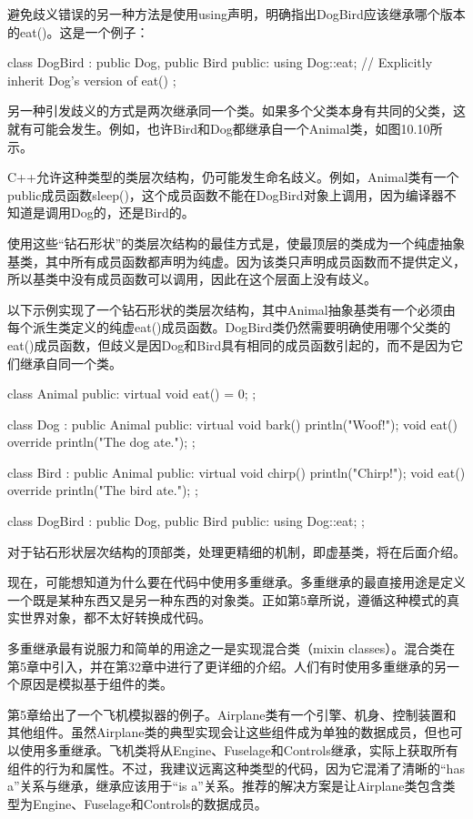 避免歧义错误的另一种方法是使用using声明，明确指出DogBird应该继承哪个版本的eat()。这是一个例子：

\begin{cpp}
class DogBird : public Dog, public Bird
{
    public:
        using Dog::eat; // Explicitly inherit Dog's version of eat()
};
\end{cpp}


另一种引发歧义的方式是两次继承同一个类。如果多个父类本身有共同的父类，这就有可能会发生。例如，也许Bird和Dog都继承自一个Animal类，如图10.10所示。


C++允许这种类型的类层次结构，仍可能发生命名歧义。例如，Animal类有一个public成员函数sleep()，这个成员函数不能在DogBird对象上调用，因为编译器不知道是调用Dog的，还是Bird的。

使用这些“钻石形状”的类层次结构的最佳方式是，使最顶层的类成为一个纯虚抽象基类，其中所有成员函数都声明为纯虚。因为该类只声明成员函数而不提供定义，所以基类中没有成员函数可以调用，因此在这个层面上没有歧义。

以下示例实现了一个钻石形状的类层次结构，其中Animal抽象基类有一个必须由每个派生类定义的纯虚eat()成员函数。DogBird类仍然需要明确使用哪个父类的eat()成员函数，但歧义是因Dog和Bird具有相同的成员函数引起的，而不是因为它们继承自同一个类。

\begin{cpp}
class Animal
{
    public:
        virtual void eat() = 0;
};

class Dog : public Animal
{
    public:
        virtual void bark() { println("Woof!"); }
        void eat() override { println("The dog ate."); }
};

class Bird : public Animal
{
    public:
        virtual void chirp() { println("Chirp!"); }
        void eat() override { println("The bird ate."); }
};

class DogBird : public Dog, public Bird
{
    public:
        using Dog::eat;
};
\end{cpp}

对于钻石形状层次结构的顶部类，处理更精细的机制，即虚基类，将在后面介绍。


现在，可能想知道为什么要在代码中使用多重继承。多重继承的最直接用途是定义一个既是某种东西又是另一种东西的对象类。正如第5章所说，遵循这种模式的真实世界对象，都不太好转换成代码。

多重继承最有说服力和简单的用途之一是实现混合类（mixin classes）。混合类在第5章中引入，并在第32章中进行了更详细的介绍。人们有时使用多重继承的另一个原因是模拟基于组件的类。

第5章给出了一个飞机模拟器的例子。Airplane类有一个引擎、机身、控制装置和其他组件。虽然Airplane类的典型实现会让这些组件成为单独的数据成员，但也可以使用多重继承。飞机类将从Engine、Fuselage和Controls继承，实际上获取所有组件的行为和属性。不过，我建议远离这种类型的代码，因为它混淆了清晰的“has a”关系与继承，继承应该用于“is a”关系。推荐的解决方案是让Airplane类包含类型为Engine、Fuselage和Controls的数据成员。

